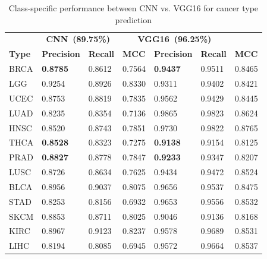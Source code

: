 \begin{table}[h]
    \caption{Class-specific performance between CNN vs. VGG16 for cancer type prediction}
      \label{table:class_specific} %
        \begin{center}
        \vspace{-6mm}
        \scriptsize{
        \begin{tabular}{l|lll|lll}
        \toprule
        {} & \multicolumn{2}{c}{\textbf{\hspace{0.7cm} CNN~(89.75\%)}} & \multicolumn{3}{c}{ \textbf{\hspace{1.5cm} VGG16~(96.25\%)}} &  {} \\
        \textbf{Type } & \textbf{Precision} &  \textbf{Recall}  & \textbf{MCC} & \textbf{Precision} &  \textbf{Recall} & \textbf{MCC} \\\midrule%
        BRCA   & {\color{red}\textbf{0.8785}} & 0.8612 & 0.7564 & {\color{red}\textbf{0.9437}} & 0.9511 & 0.8465  \\%
        LGG    & 0.9254 & 0.8926 & 0.8330 & 0.9311 & 0.9402 & 0.8421  \\%
        UCEC   & 0.8753 & 0.8819 & 0.7835 & 0.9562 & 0.9429 & 0.8445  \\%
        LUAD   & 0.8235 & 0.8354 & 0.7136 & 0.9865 & 0.9823 & 0.8624  \\%
        HNSC   & 0.8520 & 0.8743 & 0.7851 & 0.9730 & 0.9822 & 0.8765  \\%
        THCA   & {\color{red}\textbf{0.8528}} & 0.8323 & 0.7275 & {\color{red}\textbf{0.9138}} & 0.9154 & 0.8125  \\%
        PRAD   & {\color{red}\textbf{0.8827}} & 0.8778 & 0.7847 & {\color{red}\textbf{0.9233}} & 0.9347 & 0.8207  \\%
        LUSC   & 0.8726 & 0.8634 & 0.7625 & 0.9434 & 0.9472 & 0.8524  \\%
        BLCA   & 0.8956 & 0.9037 & 0.8075 & 0.9656 & 0.9537 & 0.8475  \\%
        STAD   & 0.8253 & 0.8156 & 0.6932 & 0.9653 & 0.9556 & 0.8532  \\%
        SKCM   & 0.8853 & 0.8711 & 0.8025 & 0.9046 & 0.9136 & 0.8168  \\%
        KIRC   & 0.8967 & 0.9123 & 0.8237 & 0.9578 & 0.9689 & 0.8531  \\%
        LIHC   & 0.8194 & 0.8085 & 0.6945 & 0.9572 & 0.9664 & 0.8537  \\%

\end{tabular}}
\end{center}
\end{table}
